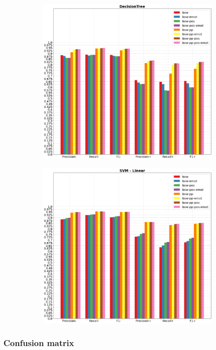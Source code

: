 \documentclass[oneside]{book}
\begin{document}
\begin{figure}[!h]
	\hspace*{-3cm}
	\begin{subfigure}[b]{0.5\textwidth}
		\centering
		\includegraphics[width=10cm]{assets/reports/micro/bow/DecisionTree.png}
	\end{subfigure}
	\hfill
	\begin{subfigure}[b]{0.5\textwidth}
		\centering
		\hspace*{0.15cm}
		\includegraphics[width=10cm]{assets/reports/micro/bow/SVM - Linear.png}
	\end{subfigure}
\end{figure}

\vfill
\restoregeometry

\newpage
{}
\subsubsection{Confusion matrix}
\end{document}
